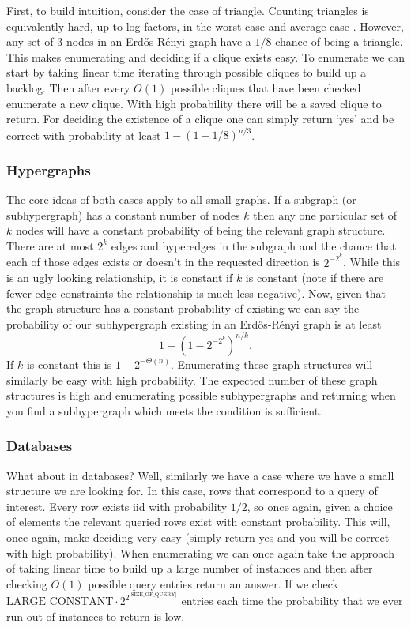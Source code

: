 \documentclass[11pt,letterpaper,pdftex]{article}
\begin{document}
First, to build intuition, consider the case of triangle. Counting triangles is equivalently hard, up to log factors, in the worst-case and average-case \cite{UniformCliqueABB}. However, any set of $3$ nodes in an Erd{\H{o}}s-R{\'{e}}nyi graph have a $1/8$ chance of being a triangle. This makes enumerating and deciding if a clique exists easy. To enumerate we can start by taking linear time iterating through possible cliques to build up a backlog. Then after every $O(1)$ possible cliques that have been checked enumerate a new clique. With high probability there will be a saved clique to return. For deciding the existence of a clique one can simply return `yes' and be correct with probability at least $1 - (1-1/8)^{n/3}$. 


\subsubsection{Hypergraphs}
The core ideas of both cases apply to all small graphs. If a subgraph (or subhypergraph) has a constant number of nodes $k$ then any one particular set of $k$ nodes will have a constant probability of being the relevant graph structure. There are at most $2^k$ edges and hyperedges in the subgraph and the chance that each of those edges exists or doesn't in the requested direction is $2^{-2^k}$. While this is an ugly looking relationship, it is constant if $k$ is constant (note if there are fewer edge constraints the relationship is much less negative). Now, given that the graph structure has a constant probability of existing we can say the probability of our subhypergraph existing in an Erd{\H{o}}s-R{\'{e}}nyi graph is at least 
$$1- (1 -2^{-2^k})^{n/k}.$$
If $k$ is constant this is $1 - 2^{-\Theta(n)}$. Enumerating these graph structures will similarly be easy with high probability. The expected number of these graph structures is high and enumerating possible subhypergraphs and returning when you find a subhypergraph which meets the condition is sufficient. 


\subsubsection{Databases}
What about in databases? Well, similarly we have a case where we have a small structure we are looking for. In this case, rows that correspond to a query of interest. Every row exists iid with probability $1/2$, so once again, given a choice of elements the relevant queried rows exist with constant probability. This will, once again, make deciding very easy (simply return yes and you will be correct with high probability). When enumerating we can once again take the approach of taking linear time to build up a large number of instances and then after checking $O(1)$ possible query entries return an answer. If we check $\text{LARGE\_CONSTANT} \cdot 2^{2^|\text{SIZE\_OF\_QUERY}|}$ entries each time the probability that we ever run out of instances to return is low. 
 
\end{document}
